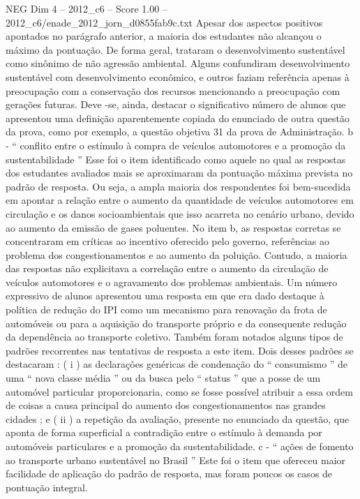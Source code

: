\begin{textsample}{NEG Dim 4 – 2012\_c6 – Score 1.00 – 2012\_c6/enade\_2012\_jorn\_d0855fab9c.txt}
Apesar dos aspectos positivos apontados no parágrafo anterior, a maioria dos estudantes não alcançou o máximo da pontuação.
De forma geral, trataram o desenvolvimento sustentável como sinônimo de não agressão ambiental.
Alguns confundiram desenvolvimento sustentável com desenvolvimento econômico, e outros faziam referência apenas à preocupação com a conservação dos recursos mencionando a preocupação com gerações futuras.
Deve -se, ainda, destacar o significativo número de alunos que apresentou uma definição aparentemente copiada do enunciado de outra questão da prova, como por exemplo, a questão objetiva 31 da prova de Administração. b - “ conflito entre o estímulo à compra de veículos automotores e a promoção da sustentabilidade ” Esse foi o item identificado como aquele no qual as respostas dos estudantes avaliados mais se aproximaram da pontuação máxima prevista no padrão de resposta.
Ou seja, a ampla maioria dos respondentes foi bem-sucedida em apontar a relação entre o aumento da quantidade de veículos automotores em circulação e os danos socioambientais que isso acarreta no cenário urbano, devido ao aumento da emissão de gases poluentes.
No item b, as respostas corretas se concentraram em críticas ao incentivo oferecido pelo governo, referências ao problema dos congestionamentos e ao aumento da poluição.
Contudo, a maioria das respostas não explicitava a correlação entre o aumento da circulação de veículos automotores e o agravamento dos problemas ambientais.
Um número expressivo de alunos apresentou uma resposta em que era dado destaque à política de redução do IPI como um mecanismo para renovação da frota de automóveis ou para a aquisição do transporte próprio e da consequente redução da dependência ao transporte coletivo.
Também foram notados alguns tipos de padrões recorrentes nas tentativas de resposta a este item.
Dois desses padrões se destacaram : ( i ) as declarações genéricas de condenação do “ consumismo ” de uma “ nova classe média ” ou da busca pelo “ status ” que a posse de um automóvel particular proporcionaria, como se fosse possível atribuir a essa ordem de coisas a causa principal do aumento dos congestionamentos nas grandes cidades ; e ( ii ) a repetição da avaliação, presente no enunciado da questão, que aponta de forma superficial a contradição entre o estímulo à demanda por automóveis particulares e a promoção da sustentabilidade. c - “ ações de fomento ao transporte urbano sustentável no Brasil ” Este foi o item que ofereceu maior facilidade de aplicação do padrão de resposta, mas foram poucos os casos de pontuação integral.

\end{textsample}
